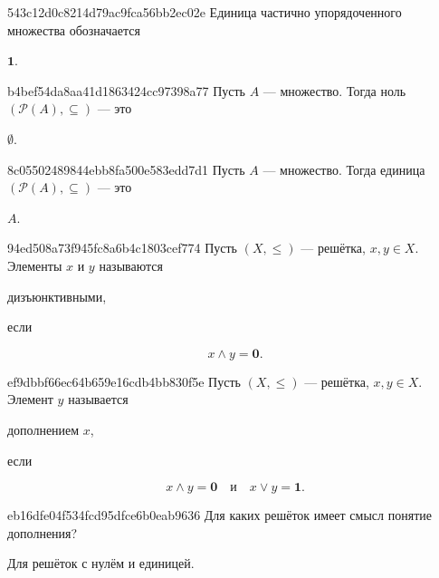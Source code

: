 \begin{note}{543c12d0c8214d79ac9fca56bb2ec02e}
    Единица частично упорядоченного множества обозначается \begin{icloze}{1}\({ \mathbf{1} }\).\end{icloze}
\end{note}

\begin{note}{b4bef54da8aa41d1863424cc97398a77}
    Пусть \({ A }\) --- множество.
    Тогда ноль \({ (\mathcal P(A), \subseteq) }\) --- это \begin{icloze}{1}\({ \emptyset }\).\end{icloze}
\end{note}

\begin{note}{8c05502489844ebb8fa500e583edd7d1}
    Пусть \({ A }\) --- множество.
    Тогда единица \({ (\mathcal P(A), \subseteq) }\) --- это \begin{icloze}{1}\({ A }\).\end{icloze}
\end{note}

\begin{note}{94ed508a73f945fc8a6b4c1803cef774}
    Пусть \({ (X, \leqslant) }\) --- решётка,\: \({ x, y \in X }\).
    Элементы \({ x }\) и \({ y }\) называются \begin{icloze}{2}дизъюнктивными,\end{icloze} если
    \begin{icloze}{1}
        \[
            x \land y = \mathbf{0}.
        \]
    \end{icloze}
\end{note}

\begin{note}{ef9dbbf66ec64b659e16cdb4bb830f5e}
    Пусть \({ (X, \leqslant) }\) --- решётка,\: \({ x, y \in X }\).
    Элемент \({ y }\) называется \begin{icloze}{2}дополнением \({ x }\),\end{icloze} если
    \begin{icloze}{1}
        \[
            x \land y = \mathbf{0} \quad \text{и} \quad x \lor y = \mathbf{1}.
        \]
    \end{icloze}
\end{note}

\begin{note}{eb16dfe04f534fcd95dfce6b0eab9636}
    Для каких решёток имеет смысл понятие дополнения?

    \begin{cloze}{1}
        Для решёток с нулём и единицей.
    \end{cloze}
\end{note}

